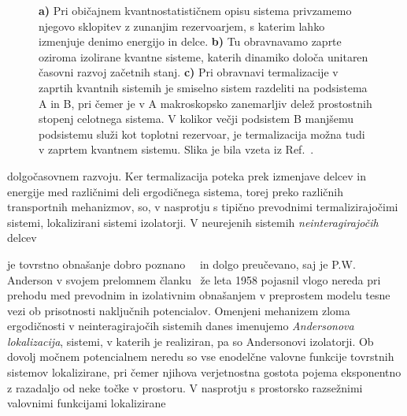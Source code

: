 \documentclass[10pt,a4paper]{article}
\begin{document}
\begin{minipage}[t]{0.55\textwidth}
\begin{figure}[H]
\caption{
\textbf{a)} Pri običajnem kvantnostatističnem opisu sistema privzamemo njegovo sklopitev z zunanjim rezervoarjem, s katerim lahko izmenjuje denimo energijo in delce. \textbf{b)} Tu obravnavamo zaprte oziroma izolirane kvantne sisteme, katerih dinamiko določa unitaren časovni razvoj začetnih stanj. \textbf{c)} Pri obravnavi termalizacije v zaprtih kvantnih sistemih je smiselno sistem razdeliti na podsistema A in B, pri čemer je v A makroskopsko zanemarljiv delež prostostnih stopenj celotnega sistema. V kolikor večji podsistem B manjšemu podsistemu služi kot toplotni rezervoar, je termalizacija možna tudi v zaprtem kvantnem sistemu. Slika je bila vzeta iz Ref.~\cite{nandkishore2015many}. 
}
\label{fig:abanin_thermalization}
\end{figure}
\end{minipage}
dolgočasovnem razvoju. Ker termalizacija poteka prek izmenjave delcev in energije med različnimi deli ergodičnega
sistema, torej preko različnih transportnih mehanizmov, so, v nasprotju s tipično prevodnimi termalizirajočimi sistemi, lokalizirani sistemi izolatorji. V neurejenih sistemih \emph{neinteragirajočih} delcev \\
\begin{minipage}[t]{0.42\textwidth}
\noindent 
je tovrstno
obnašanje dobro poznano~\cite{lagendijk2009fifty}~\cite{abrahams201050} in dolgo preučevano, saj je P.W. Anderson v svojem prelomnem članku~\cite{anderson1958absence} že leta 1958 pojasnil vlogo nereda pri prehodu med prevodnim 
in izolativnim obnašanjem v preprostem modelu tesne vezi ob prisotnosti naključnih potencialov. Omenjeni mehanizem zloma ergodičnosti v neinteragirajočih sistemih danes imenujemo \emph{Andersonova lokalizacija}, sistemi, v katerih je realiziran, pa so Andersonovi izolatorji. Ob dovolj močnem potencialnem neredu so vse enodelčne valovne funkcije tovrstnih sistemov lokalizirane, pri čemer njihova verjetnostna gostota pojema eksponentno z razadaljo od neke točke v prostoru. V nasprotju s prostorsko razsežnimi valovnimi funkcijami lokalizirane 
\end{minipage}\hfill
\end{document}
